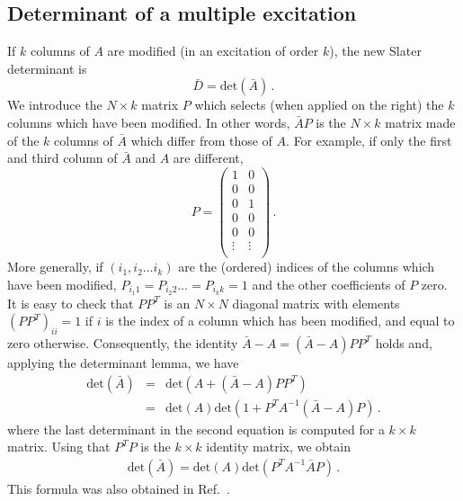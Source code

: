 \documentclass[aip,jcp,reprint,floatfix,onecolumn]{revtex4-1}
\def\det{\text{det}}
\def\A{A}
\def\wdet{D}
\begin{document}
\subsection{Determinant of a multiple excitation}

If $k$ columns of $\A$ are  modified (in an excitation of order $k$), the new Slater determinant is
\begin{equation}
\bar{\wdet} = \det (\bar{A})\,.
\end{equation}
We introduce the $N \times k$ matrix $P$ which selects (when applied on the right) the $k$ columns which have been modified.
In other words, $\bar{A} P$ is the $N \times k$ matrix made of the   $k$ columns of   $\bar{A}$ which differ from those of $A$.
For example, if only the first and third column of $\bar{A}$ and $A$ are different,
\begin{equation}
P = \left( \begin{array}{cccccc}
1 & 0  \\
0 & 0  \\
0 & 1  \\
0 & 0  \\
0 & 0  \\
\vdots & \vdots \\
\end{array} \right)\,.
\end{equation}
More generally, if $(i_1, i_2 \dots i_k)$ %
are the (ordered) indices of the columns which have been modified, $P_{i_1 1}=P_{i_2 2} \dots = P_{i_k k }=1$ and the other coefficients of $P$ zero.
It is easy to check that $P P^T$ is an $N \times N$ diagonal matrix  with elements $(P P^T)_{ii}=1$ if $i$ is
the index of a column which has been modified, and equal to zero otherwise.
Consequently, the identity  $\bar{A}-A = (\bar{A}-A)P P^T $ holds and, applying the determinant lemma, we have
\begin{eqnarray}
\det (\bar{\A})
&  =& \det(A + (\bar{A}-A)P P^T) \nonumber\\
& = & \det (\A) \det (1 +  P^T \A^{-1} (\bar{\A}-\A) P)\,.
\end{eqnarray}
where the last determinant in the second equation is computed for a $k \times k$ matrix.
Using that $P^T P$ is the $k\times k$ identity matrix, we obtain
\begin{eqnarray}
\det (\bar{\A}) = \det (\A)  \det (P^T \A^{-1} \bar{\A} P)\,.
\label{detk0}
\end{eqnarray}
This formula was also obtained in Ref.~.
\end{document}
